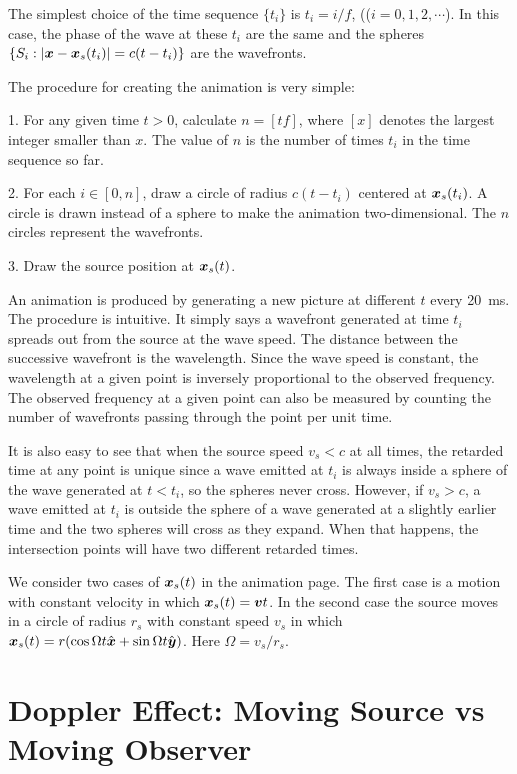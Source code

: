 \documentclass[12pt]{article}
\newcommand{\ve}[1]{\mbox{\boldmath $#1$}}
\begin{document}
The simplest choice of the time sequence $\{t_i\}$ is $t_i=i/f$, (($i=0, 1, 2,\cdots$). 
In this case, the phase of the wave at these $t_i$ are the same and the spheres 
$\{S_i: |\ve{x}-\ve{x}_s(t_i)| = c(t-t_i)\}$ are the wavefronts.

The procedure for creating the animation is very simple: 

1. For any given time $t>0$, calculate $n=[tf]$, where $[x]$ denotes the largest 
integer smaller than $x$. The value of $n$ is the number of times $t_i$ in the 
time sequence so far.

2. For each $i\in [0,n]$, draw a circle of radius $c(t-t_i)$ centered at $\ve{x}_s(t_i)$. 
A circle is drawn instead of a sphere to make the animation two-dimensional. The $n$ 
circles represent the wavefronts.

3. Draw the source position at $\ve{x}_s(t)$.

An animation is produced by generating a new picture at different $t$ every 20~ms. 
The procedure is intuitive. It simply says a wavefront generated at time $t_i$ 
spreads out from the source at the wave speed. The distance between the successive 
wavefront is the wavelength. Since the wave speed is constant, the wavelength at 
a given point is inversely proportional to the observed frequency. The observed 
frequency at a given point can also be measured by counting the number of wavefronts 
passing through the point per unit time. 

It is also easy to see that when the source speed $v_s <c$ at all times, the 
retarded time at any point is unique since a wave emitted at $t_i$ is always 
inside a sphere of the wave generated at $t<t_i$, so the spheres never cross. 
However, if $v_s>c$, a wave emitted at $t_i$ is outside the sphere of a wave generated 
at a slightly earlier time and the two spheres will cross as they expand. 
When that happens, the 
intersection points will have two different retarded times.

We consider two cases of $\ve{x}_s(t)$ in the animation page. The first case is 
a motion with constant velocity in which $\ve{x}_s(t)=\ve{v} t$. In the second case 
the source moves in a circle of radius $r_s$ with constant speed $v_s$ in which 
$\ve{x}_s(t) = r(\cos \Omega t \hat{\ve{x}} + \sin \Omega t \hat{\ve{y}})$.
Here $\Omega = v_s/r_s$.

\section{Doppler Effect: Moving Source vs Moving Observer}
\end{document}
